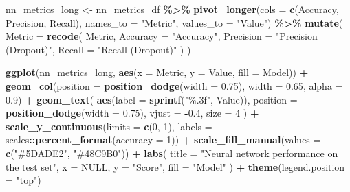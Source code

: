 \documentclass[
]{article}
\newenvironment{Shaded}{\begin{snugshade}}{\end{snugshade}}
\newcommand{\AttributeTok}[1]{\textcolor[rgb]{0.13,0.29,0.53}{#1}}
\newcommand{\ConstantTok}[1]{\textcolor[rgb]{0.56,0.35,0.01}{#1}}
\newcommand{\DecValTok}[1]{\textcolor[rgb]{0.00,0.00,0.81}{#1}}
\newcommand{\FloatTok}[1]{\textcolor[rgb]{0.00,0.00,0.81}{#1}}
\newcommand{\FunctionTok}[1]{\textcolor[rgb]{0.13,0.29,0.53}{\textbf{#1}}}
\newcommand{\NormalTok}[1]{#1}
\newcommand{\OtherTok}[1]{\textcolor[rgb]{0.56,0.35,0.01}{#1}}
\newcommand{\SpecialCharTok}[1]{\textcolor[rgb]{0.81,0.36,0.00}{\textbf{#1}}}
\newcommand{\StringTok}[1]{\textcolor[rgb]{0.31,0.60,0.02}{#1}}
\begin{document}
\begin{Shaded}
\begin{Highlighting}[]
\NormalTok{nn\_metrics\_long }\OtherTok{\textless{}{-}}\NormalTok{ nn\_metrics\_df }\SpecialCharTok{\%\textgreater{}\%}
  \FunctionTok{pivot\_longer}\NormalTok{(}\AttributeTok{cols =} \FunctionTok{c}\NormalTok{(Accuracy, Precision, Recall), }\AttributeTok{names\_to =} \StringTok{"Metric"}\NormalTok{, }\AttributeTok{values\_to =} \StringTok{"Value"}\NormalTok{) }\SpecialCharTok{\%\textgreater{}\%}
  \FunctionTok{mutate}\NormalTok{(}
    \AttributeTok{Metric =} \FunctionTok{recode}\NormalTok{(}
\NormalTok{      Metric,}
      \AttributeTok{Accuracy =} \StringTok{"Accuracy"}\NormalTok{,}
      \AttributeTok{Precision =} \StringTok{"Precision (Dropout)"}\NormalTok{,}
      \AttributeTok{Recall =} \StringTok{"Recall (Dropout)"}
\NormalTok{    )}
\NormalTok{  )}

\FunctionTok{ggplot}\NormalTok{(nn\_metrics\_long, }\FunctionTok{aes}\NormalTok{(}\AttributeTok{x =}\NormalTok{ Metric, }\AttributeTok{y =}\NormalTok{ Value, }\AttributeTok{fill =}\NormalTok{ Model)) }\SpecialCharTok{+}
  \FunctionTok{geom\_col}\NormalTok{(}\AttributeTok{position =} \FunctionTok{position\_dodge}\NormalTok{(}\AttributeTok{width =} \FloatTok{0.75}\NormalTok{), }\AttributeTok{width =} \FloatTok{0.65}\NormalTok{, }\AttributeTok{alpha =} \FloatTok{0.9}\NormalTok{) }\SpecialCharTok{+}
  \FunctionTok{geom\_text}\NormalTok{(}
    \FunctionTok{aes}\NormalTok{(}\AttributeTok{label =} \FunctionTok{sprintf}\NormalTok{(}\StringTok{"\%.3f"}\NormalTok{, Value)),}
    \AttributeTok{position =} \FunctionTok{position\_dodge}\NormalTok{(}\AttributeTok{width =} \FloatTok{0.75}\NormalTok{),}
    \AttributeTok{vjust =} \SpecialCharTok{{-}}\FloatTok{0.4}\NormalTok{,}
    \AttributeTok{size =} \DecValTok{4}
\NormalTok{  ) }\SpecialCharTok{+}
  \FunctionTok{scale\_y\_continuous}\NormalTok{(}\AttributeTok{limits =} \FunctionTok{c}\NormalTok{(}\DecValTok{0}\NormalTok{, }\DecValTok{1}\NormalTok{), }\AttributeTok{labels =}\NormalTok{ scales}\SpecialCharTok{::}\FunctionTok{percent\_format}\NormalTok{(}\AttributeTok{accuracy =} \DecValTok{1}\NormalTok{)) }\SpecialCharTok{+}
  \FunctionTok{scale\_fill\_manual}\NormalTok{(}\AttributeTok{values =} \FunctionTok{c}\NormalTok{(}\StringTok{"\#5DADE2"}\NormalTok{, }\StringTok{"\#48C9B0"}\NormalTok{)) }\SpecialCharTok{+}
  \FunctionTok{labs}\NormalTok{(}
    \AttributeTok{title =} \StringTok{"Neural network performance on the test set"}\NormalTok{,}
    \AttributeTok{x =} \ConstantTok{NULL}\NormalTok{,}
    \AttributeTok{y =} \StringTok{"Score"}\NormalTok{,}
    \AttributeTok{fill =} \StringTok{"Model"}
\NormalTok{  ) }\SpecialCharTok{+}
  \FunctionTok{theme}\NormalTok{(}\AttributeTok{legend.position =} \StringTok{"top"}\NormalTok{)}
\end{Highlighting}
\end{Shaded}
\end{document}
